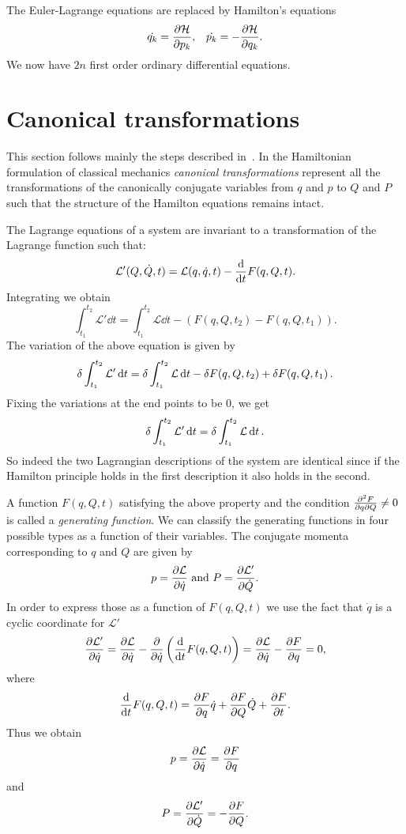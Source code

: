 \documentclass[../thesis.tex]{subfiles}
\theoremstyle{plain}
\begin{document}
The Euler-Lagrange equations are replaced by Hamilton's equations
\begin{align*}
  \dot{q_k} = \pdv{\mathcal{H}}{p_k}, &&
  \dot{p_k} = -\pdv{\mathcal{H}}{q_k}.
\end{align*}
We now have \(2n\) first order ordinary differential equations.

\section{Canonical transformations}

This section follows mainly the steps described in~\cite{Hand1998}.
In the Hamiltonian formulation of classical mechanics \emph{canonical transformations}
represent all the transformations of the canonically conjugate variables from
$q$ and $p$ to $Q$ and $P$ such that the structure of the Hamilton equations remains intact.

The Lagrange equations of a system are invariant to a transformation of the
Lagrange function such that:
\[
  \mathcal{L'}(Q, \dot{Q}, t) = \mathcal{L}(q, \dot{q}, t) - \dv{t}F(q, Q, t).
\]
Integrating we obtain
\[
  \int_{t_1}^{t_2} \mathcal{L'} \dd{t} = \int_{t_1}^{t_2} \mathcal{L} \dd{t}
  - \left( F(q, Q, t_2) - F(q, Q, t_1) \right).
\]
The variation of the above equation is given by
\[
  \var{\int_{t_1}^{t_2} \mathcal{L'} \dd{t}} = \var{\int_{t_1}^{t_2} \mathcal{L} \dd{t}}
  - \var{F(q, Q, t_2)} + \var{F(q, Q, t_1)}.
\]
Fixing the variations at the end points to be $0$, we get
\[
  \var{\int_{t_1}^{t_2} \mathcal{L'} \dd{t}} = \var{\int_{t_1}^{t_2} \mathcal{L} \dd{t}}.
\]
So indeed the two Lagrangian descriptions of the system are identical since if the
\mbox{Hamilton} principle holds in the first description it also holds in the second.

A function \(F(q, Q, t)\) satisfying the above property and the condition
\(\pdv{F}{q}{Q} \neq 0\) is called a \emph{generating function}.
We can classify the generating functions in four possible types
as a function of their variables.
The conjugate momenta corresponding to $q$ and $Q$ are given by
\[
  p = \pdv{\mathcal{L}}{\dot{q}} \text{ and } P = \pdv{\mathcal{L'}}{\dot{Q}}.
\]
In order to express those as a function of \(F(q, Q, t)\) we use the fact
that \(\dot{q}\) is a cyclic coordinate for \(\mathcal{L'}\)
\[
  \pdv{\mathcal{L'}}{\dot{q}} = \pdv{\mathcal{L}}{\dot{q}} -
  \pdv{\dot{q}} \left( \dv{t}F(q, Q, t) \right) =
  \pdv{\mathcal{L}}{\dot{q}} - \pdv{F}{q} = 0,
\]
where
\[
  \dv{t}F(q, Q, t) = \pdv{F}{q} \dot{q} + \pdv{F}{Q} \dot{Q} + \pdv{F}{t}.
\]
Thus we obtain
\[
  p = \pdv{\mathcal{L}}{\dot{q}} = \pdv{F}{q}
\]
and
\[
  P = \pdv{\mathcal{L'}}{\dot{Q}} = - \pdv{F}{Q}.
\]
\end{document}
